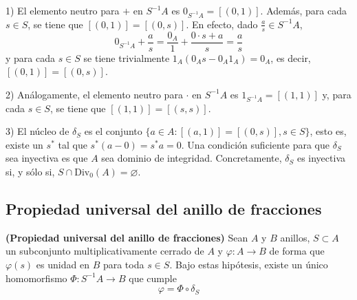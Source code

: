 \documentclass[../main.tex]{subfiles}
\begin{document}
	\begin{remark}\label{iny}
		1) El elemento neutro para $+$ en $S^{-1}A$ es $0_{S^{-1}A}=[(0,1)]$. Además, para cada $s\in S$, se tiene que $[(0,1)]=[(0,s)]$. En efecto, dado $\frac{a}{s}\in S^{-1}A$, $$0_{S^{-1}A}+\frac{a}{s}=\frac{0_A}{1}+\frac{0\cdot s+a}{s}=\frac{a}{s}$$
		y para cada $s\in S$ se tiene trivialmente $1_A(0_As-0_A1_A)=0_A$, es decir, $[(0,1)]=[(0,s)]$.

		2) Análogamente, el elemento neutro para $·$ en $S^{-1}A$ es $1_{S^{-1}A}=[(1,1)]$ y, para cada $s\in S$, se tiene que $[(1,1)]=[(s,s)]$.

		3) El núcleo de $\delta_S$ es el conjunto $\{a\in A:[(a,1)]=[(0,s)], s\in S\}$, esto es, existe un $s^{\ast}$ tal que $s^{\ast}(a-0)=s^{\ast}a=0$. Una condición suficiente para que $\delta_S$ sea inyectiva es que $A$ sea dominio de integridad. Concretamente, $\delta_S$ es inyectiva si, y sólo si, $S\cap\operatorname{Div_0}(A)=\varnothing$.
	\end{remark}

	\subsection{Propiedad universal del anillo de fracciones}
	\begin{theorem}\textbf{(Propiedad universal del anillo de fracciones)} Sean $A$ y $B$ anillos, $S\subset A$ un subconjunto multiplicativamente cerrado de $A$ y $\varphi:A\longrightarrow B$ de forma que $\varphi(s)$ es unidad en $B$ para toda $s\in S$. Bajo estas hipótesis, existe un único homomorfismo $\Phi:S^{-1}A\longrightarrow B$ que cumple
		$$\varphi=\Phi\circ\delta_S$$
	\end{theorem}
\end{document}
